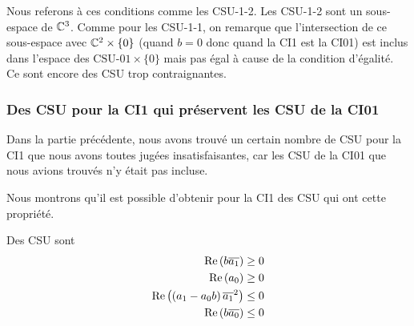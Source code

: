       Nous referons à ces conditions comme les CSU-1-2. Les CSU-1-2 sont un sous-espace de \(\mathbb C^3\). Comme pour les CSU-1-1, on remarque que l'intersection de ce sous-espace avec \(\mathbb C^2 \times \lbrace0\rbrace\) (quand \(b=0\) donc quand la CI1 est la CI01) est inclus dans l'espace des \(\text{CSU-01}\times\lbrace0\rbrace\) mais pas égal à cause de la condition d'égalité. Ce sont encore des CSU trop contraignantes.



        

    \subsubsection{Des CSU pour la CI1 qui préservent les CSU de la CI01}
      Dans la partie précédente, nous avons trouvé un certain nombre de CSU pour la CI1 que nous avons toutes jugées insatisfaisantes, car les CSU de la CI01 que nous avions trouvés n'y était pas incluse.%

      Nous montrons qu'il est possible d'obtenir pour la CI1 des CSU qui ont cette propriété.

      \begin{prop} Des CSU sont
          \begin{align}
            \operatorname{Re}\left(b{\overline{a_1}}\right) \ge 0
            \\
            \operatorname{Re}\left(a_0\right) \ge 0
            \\
            \operatorname{Re}\left(\left(a_1-a_0 b\right){{\overline{a_1}}^2}\right) \le 0
            \\
            \operatorname{Re}\left(b{\overline{a_0}}\right) \le 0
          \end{align}
      \end{prop}


